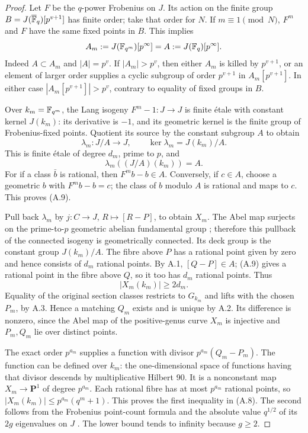 \begin{proof}
Let $F$ be the $q$-power Frobenius on $J$. Its action on the
finite group $B=J(\overline{\mathbb F}_q)[p^{v+1}]$ has finite order;
take that order for $N$. If $m\equiv1\pmod N$, $F^m$ and $F$
have the same fixed points in $B$. This implies
\[
 A_m:=J(\mathbb F_{q^m})[p^\infty]=A:=J(\mathbb F_q)[p^\infty].
\]
Indeed $A\subset A_m$ and $|A|=p^v$. If $|A_m|>p^v$, then
either $A_m$ is killed by $p^{v+1}$, or an element of larger
order supplies a cyclic subgroup of order $p^{v+1}$ in
$A_m[p^{v+1}]$. In either case $|A_m[p^{v+1}]|>p^v$, contrary
to equality of fixed groups in $B$.

Over $k_m=\mathbb F_{q^m}$, the Lang isogeny $F^m-1:J\to J$ is
finite \'etale with constant kernel $J(k_m)$: its derivative
is $-1$, and its geometric kernel is the finite group of
Frobenius-fixed points. Quotient its source by the constant
subgroup $A$ to obtain
\[
 \lambda_m:J/A\longrightarrow J,
 \qquad\ker\lambda_m=J(k_m)/A.
\]
This is finite \'etale of degree $d_m$, prime to $p$, and
\[
 \lambda_m((J/A)(k_m))=A.                                       \tag{A.9}
\]
For if a class $\bar b$ is rational, then $F^m b-b\in A$.
Conversely, if $c\in A$, choose a geometric $b$ with
$F^m b-b=c$; the class of $b$ modulo $A$ is rational and
maps to $c$. This proves (A.9).

Pull back $\lambda_m$ by $j:C\to J$, $R\mapsto[R-P]$, to
obtain $X_m$. The Abel map surjects on the prime-to-$p$
geometric abelian fundamental group
\citep[III, Proposition 9.1 and \S9]{A_Milne2008}; therefore
this pullback of the connected isogeny is geometrically
connected. Its deck group is the constant group $J(k_m)/A$.
The fibre above $P$ has a rational point given by zero and
hence consists of $d_m$ rational points. By A.1,
$[Q-P]\in A$; (A.9) gives a rational point in the fibre above
$Q$, so it too has $d_m$ rational points. Thus
\[
 |X_m(k_m)|\ge2d_m.
\]
Equality of the original section classes restricts to $G_{k_m}$
and lifts with the chosen $P_m$, by A.3. Hence a matching
$Q_m$ exists and is unique by A.2. Its difference is nonzero,
since the Abel map of the positive-genus curve $X_m$ is
injective and $P_m,Q_m$ lie over distinct points.

The exact order $p^{a_m}$ supplies a function with divisor
$p^{a_m}(Q_m-P_m)$. The function can be defined over $k_m$:
the one-dimensional space of functions having that divisor
descends by multiplicative Hilbert 90. It is a nonconstant
map $X_m\to\mathbf P^1$ of degree $p^{a_m}$. Each rational
fibre has at most $p^{a_m}$ rational points, so
$|X_m(k_m)|\le p^{a_m}(q^m+1)$. This proves the first
inequality in (A.8). The second follows from the Frobenius
point-count formula and the absolute value $q^{1/2}$ of its
$2g$ eigenvalues on $J$ \citep[II, Theorem 1.1]{A_Milne2008}.
The lower bound tends to infinity because $g\ge2$.
\end{proof}

